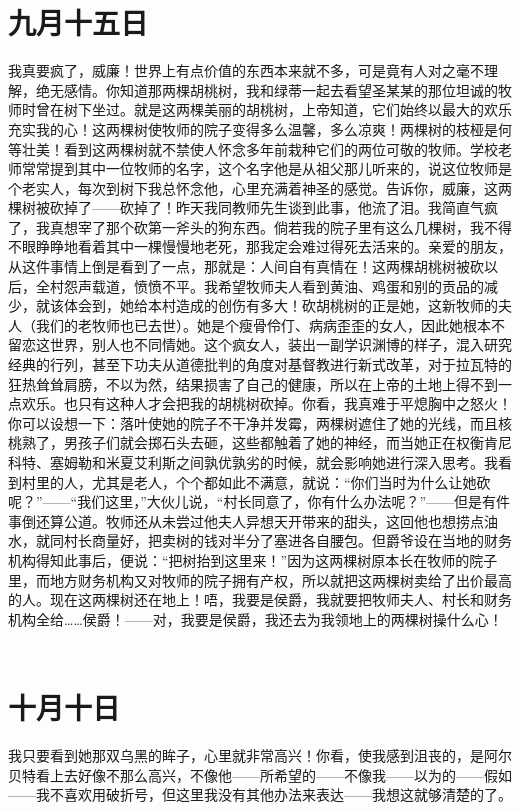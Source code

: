 \documentclass[12pt,oneside]{book}
\begin{document}
\chapter{九月十五日}
\label{sec-4-16}
我真要疯了，威廉！世界上有点价值的东西本来就不多，可是竟有人对之毫不理解，绝无感情。你知道那两棵胡桃树，我和绿蒂一起去看望圣某某的那位坦诚的牧师时曾在树下坐过。就是这两棵美丽的胡桃树，上帝知道，它们始终以最大的欢乐充实我的心！这两棵树使牧师的院子变得多么温馨，多么凉爽！两棵树的枝桠是何等壮美！看到这两棵树就不禁使人怀念多年前栽种它们的两位可敬的牧师。学校老师常常提到其中一位牧师的名字，这个名字他是从祖父那儿听来的，说这位牧师是个老实人，每次到树下我总怀念他，心里充满着神圣的感觉。告诉你，威廉，这两棵树被砍掉了——砍掉了！昨天我同教师先生谈到此事，他流了泪。我简直气疯了，我真想宰了那个砍第一斧头的狗东西。倘若我的院子里有这么几棵树，我不得不眼睁睁地看着其中一棵慢慢地老死，那我定会难过得死去活来的。亲爱的朋友，从这件事情上倒是看到了一点，那就是：人间自有真情在！这两棵胡桃树被砍以后，全村怨声载道，愤愤不平。我希望牧师夫人看到黄油、鸡蛋和别的贡品的减少，就该体会到，她给本村造成的创伤有多大！砍胡桃树的正是她，这新牧师的夫人（我们的老牧师也已去世）。她是个瘦骨伶仃、病病歪歪的女人，因此她根本不留恋这世界，别人也不同情她。这个疯女人，装出一副学识渊博的样子，混入研究经典的行列，甚至下功夫从道德批判的角度对基督教进行新式改革，对于拉瓦特的狂热耸耸肩膀，不以为然，结果损害了自己的健康，所以在上帝的土地上得不到一点欢乐。也只有这种人才会把我的胡桃树砍掉。你看，我真难于平熄胸中之怒火！你可以设想一下：落叶使她的院子不干净并发霉，两棵树遮住了她的光线，而且核桃熟了，男孩子们就会掷石头去砸，这些都触着了她的神经，而当她正在权衡肯尼科特、塞姆勒和米夏艾利斯之间孰优孰劣的时候，就会影响她进行深入思考。我看到村里的人，尤其是老人，个个都如此不满意，就说：“你们当时为什么让她砍呢？”——“我们这里，”大伙儿说，“村长同意了，你有什么办法呢？”——但是有件事倒还算公道。牧师还从未尝过他夫人异想天开带来的甜头，这回他也想捞点油水，就同村长商量好，把卖树的钱对半分了塞进各自腰包。但爵爷设在当地的财务机构得知此事后，便说：“把树抬到这里来！”因为这两棵树原本长在牧师的院子里，而地方财务机构又对牧师的院子拥有产权，所以就把这两棵树卖给了出价最高的人。现在这两棵树还在地上！唔，我要是侯爵，我就要把牧师夫人、村长和财务机构全给……侯爵！——对，我要是侯爵，我还去为我领地上的两棵树操什么心！
　　

\chapter{十月十日}
\label{sec-4-17}
我只要看到她那双乌黑的眸子，心里就非常高兴！你看，使我感到沮丧的，是阿尔贝特看上去好像不那么高兴，不像他——所希望的——不像我——以为的——假如——我不喜欢用破折号，但这里我没有其他办法来表达——我想这就够清楚的了。
　　
\end{document}
